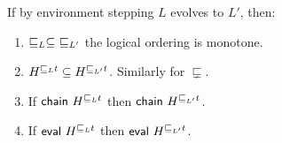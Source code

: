 \begin{lemma}\label{lem:menvs}
If by environment stepping $L$ evolves to $L'$, then:
\begin{enumerate}
 \item\label{lem:menvs:jleq} $ \mathrel{\sqsubseteq_L} \subseteq\ \mathrel{\sqsubseteq_{L'}}$ \ie the
 logical ordering is monotone.

 \item \label{lem:menvs:drs} $H^{\hbox{}\sqsubseteq_L
 t} \subseteq H^{\hbox{}\sqsubseteq_{L'} t}$. 
%
Similarly for $\sqsubsetneq$.
 
 \item \label{lem:menvs:chain} If $\mathsf{chain}\
 H^{\hbox{}\sqsubseteq_L t}$ then $\mathsf{chain}\
 H^{\hbox{}\sqsubseteq_{L'} t}$.

 \item \label{lem:menvs:eval} If $\mathsf{eval}\
 H^{\hbox{}\sqsubseteq_L t}$ then $\mathsf{eval}\
 H^{\hbox{}\sqsubseteq_{L'} t}$.
\end{enumerate}
\end{lemma}
%
%

